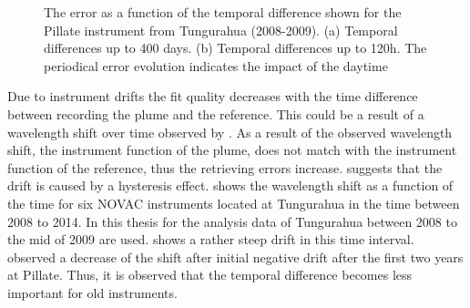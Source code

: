 \begin{figure}
	\caption{The  error as a function of the temporal difference shown for the Pillate instrument from Tungurahua (2008-2009). (a) Temporal differences up to 400 days. (b) Temporal differences up to 120h. The periodical   error evolution indicates the impact of the daytime}
	\label{fig:dat}
\end{figure}
%
Due to instrument drifts the fit quality decreases with the time difference between recording the plume and the reference. This could be a result of a wavelength shift over time observed by \citet{WarnachSimon}. As a result of the observed wavelength shift, the instrument function of the plume, does not match with the instrument function of the reference, thus the retrieving errors increase. \citet{WarnachSimon} suggests that the drift is caused by a hysteresis effect.  shows the wavelength shift as a function of the time for six NOVAC instruments located at Tungurahua in the time between 2008 to 2014. In this thesis for the analysis data of Tungurahua between 2008 to the mid of 2009 are used.  shows a rather steep drift in this time interval. \citet{WarnachSimon} observed a decrease of the shift after initial negative drift after the first two years at Pillate. Thus, it is observed that the temporal difference becomes less important for old instruments.\\
